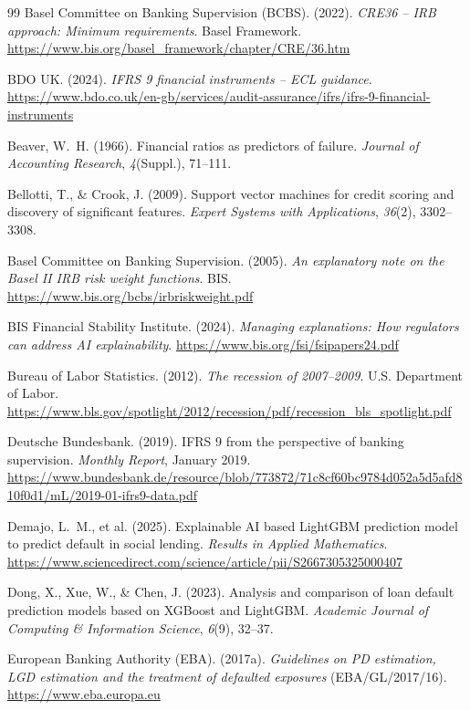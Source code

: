 \documentclass[12pt,a4paper]{report}
\begin{document}
\begin{thebibliography}{99}
Basel Committee on Banking Supervision (BCBS). (2022). \textit{CRE36 -- IRB approach: Minimum requirements}. Basel Framework. \url{https://www.bis.org/basel_framework/chapter/CRE/36.htm}

BDO UK. (2024). \textit{IFRS 9 financial instruments -- ECL guidance}. \url{https://www.bdo.co.uk/en-gb/services/audit-assurance/ifrs/ifrs-9-financial-instruments}

Beaver, W.~H. (1966). Financial ratios as predictors of failure. \textit{Journal of Accounting Research}, \textit{4}(Suppl.), 71--111.

Bellotti, T., \& Crook, J. (2009). Support vector machines for credit scoring and discovery of significant features. \textit{Expert Systems with Applications}, \textit{36}(2), 3302--3308.

Basel Committee on Banking Supervision. (2005). \textit{An explanatory note on the Basel II IRB risk weight functions}. BIS. \url{https://www.bis.org/bcbs/irbriskweight.pdf}

BIS Financial Stability Institute. (2024). \textit{Managing explanations: How regulators can address AI explainability}. \url{https://www.bis.org/fsi/fsipapers24.pdf}

Bureau of Labor Statistics. (2012). \textit{The recession of 2007--2009}. U.S. Department of Labor. \url{https://www.bls.gov/spotlight/2012/recession/pdf/recession_bls_spotlight.pdf}

Deutsche Bundesbank. (2019). IFRS 9 from the perspective of banking supervision. \textit{Monthly Report}, January 2019. \url{https://www.bundesbank.de/resource/blob/773872/71c8cf60bc9784d052a5d5afd810f0d1/mL/2019-01-ifrs9-data.pdf}

Demajo, L.~M., et al. (2025). Explainable AI based LightGBM prediction model to predict default in social lending. \textit{Results in Applied Mathematics}. \url{https://www.sciencedirect.com/science/article/pii/S2667305325000407}

Dong, X., Xue, W., \& Chen, J. (2023). Analysis and comparison of loan default prediction models based on XGBoost and LightGBM. \textit{Academic Journal of Computing \& Information Science}, \textit{6}(9), 32--37.

European Banking Authority (EBA). (2017a). \textit{Guidelines on PD estimation, LGD estimation and the treatment of defaulted exposures} (EBA/GL/2017/16). \url{https://www.eba.europa.eu}


\end{thebibliography}
\end{document}
